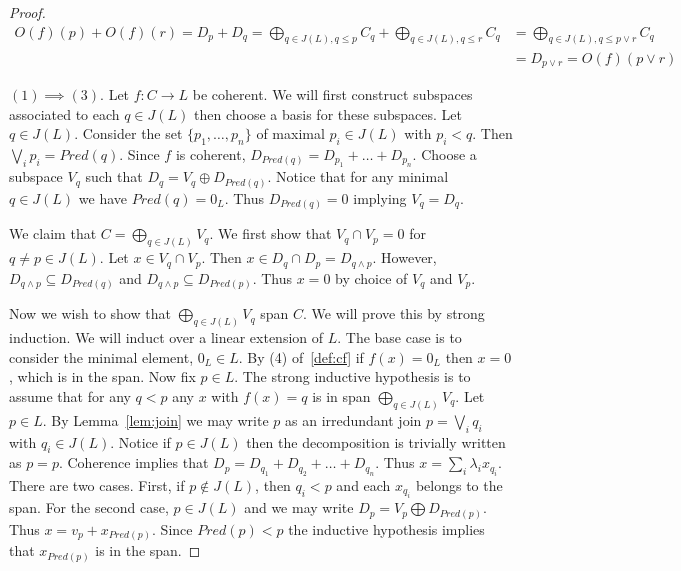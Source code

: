 \begin{proof}
\begin{align*}
O(f)(p) + O(f)(r) = D_p+ D_q = \bigoplus_{q\in J(L),q\leq p} C_q + \bigoplus_{q\in J(L), q\leq r} C_q &= \bigoplus_{q\in J(L),q\leq p\vee r} C_q \\&= D_{p\vee r} = O(f)(p\vee r)
\end{align*}

 $(1)\implies (3)$.  Let $f:C\to L$ be coherent.  We will first construct subspaces associated to each $q\in J(L)$ then choose a basis for these subspaces.  Let $q\in J(L)$.  Consider the set $\{p_1,\ldots,p_n\}$ of maximal $p_i\in J(L)$ with $p_i < q$.  Then $\bigvee_i p_i = Pred(q)$.   Since $f$ is coherent, $D_{Pred(q)} = D_{p_1}+\ldots + D_{p_n}$.  Choose a subspace $V_q$ such that $D_q = V_q \oplus D_{Pred(q)}$.  Notice that for any minimal $q\in J(L)$ we have $Pred(q)=0_L$.  Thus $D_{Pred(q)}=0$ implying $V_q = D_q$.

We claim that $C = \bigoplus_{q\in J(L)} V_q$.  We first show that $V_q\cap V_p=0$ for $q\neq p\in J(L)$.  Let $x\in V_q\cap V_p$.  Then $x\in D_q\cap D_p = D_{q\wedge p}$.  However, $D_{q\wedge p}\subseteq D_{Pred(q)}$ and $D_{q\wedge p}\subseteq D_{Pred(p)}$.  Thus $x=0$ by choice of $V_q$ and $V_p$.  

Now we wish to show that $\bigoplus_{q\in J(L)} V_q$ span $C$.  We will prove this by strong induction.  We will induct over a linear extension of $L$.  The base case is to consider the minimal element, $0_L\in L$.  By (4) of~\ref{def:cf} if $f(x)=0_L$ then $x=0$, which is in the span.   Now fix $p\in L$.  The strong inductive hypothesis is to assume that for any $q< p$ any $x$ with $f(x)=q$ is in span $\bigoplus_{q\in J(L)} V_q$.  Let $p\in L$.  By Lemma~\ref{lem:join} we may write $p$ as an irredundant join $p=\bigvee_i q_i$ with $q_i \in J(L)$. Notice if $p\in J(L)$ then the decomposition is trivially written as $p=p$.  Coherence implies that $D_p = D_{q_1}+D_{q_2}+\ldots+D_{q_n}$.  Thus $x= \sum_i \lambda_i x_{q_i}$.  There are two cases.  First, if $p\not\in J(L)$, then $q_i< p$ and each $x_{q_i}$ belongs to the span.  For the second case, $p\in J(L)$ and we may write $D_p = V_p \bigoplus D_{Pred(p)}$.  Thus $x = v_p + x_{Pred(p)}$.  Since $Pred(p)<p$ the inductive hypothesis implies that $x_{Pred(p)}$ is in the span. 




\end{proof}
